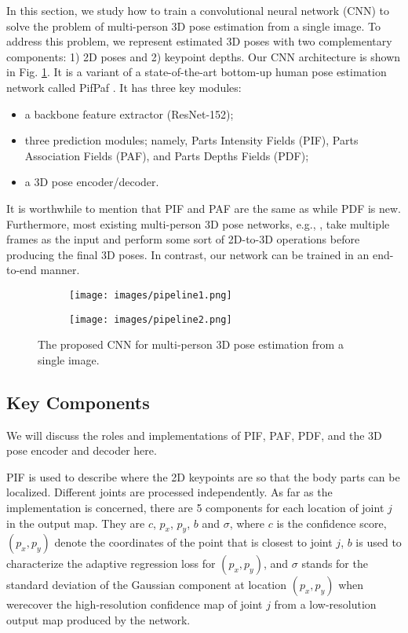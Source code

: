 \documentclass{article}
\begin{document}
In this section, we study how to train a convolutional neural network
(CNN) to solve the problem of multi-person 3D pose estimation from a
single image. To address this problem, we represent estimated 3D poses
with two complementary components: 1) 2D poses and 2) keypoint depths.
Our CNN architecture is shown in Fig. \ref{fig:network}. It is a variant
of a state-of-the-art bottom-up human pose estimation network called
PifPaf \cite{kreiss2019pifpaf}. It has three key modules: 
\begin{itemize}
\item a backbone feature extractor (ResNet-152);
\item three prediction modules; namely, Parts Intensity Fields (PIF), 
Parts Association Fields (PAF), and Parts Depths Fields (PDF);
\item a 3D pose encoder/decoder.
\end{itemize}

It is worthwhile to mention that PIF and PAF are the same as
\cite{kreiss2019pifpaf} while PDF is new. Furthermore, most existing
multi-person 3D pose networks, e.g., \cite{arnab2019exploiting,
huang2019deepfuse}, take multiple frames as the input and perform some
sort of 2D-to-3D operations before producing the final 3D poses. In
contrast, our network can be trained in an end-to-end manner. 

\begin{figure}[h]
\centering
\begin{subfigure}[b]{0.8\textwidth}
\texttt{[image: images/pipeline1.png]}
\end{subfigure}
\begin{subfigure}[b]{0.8\textwidth}
\texttt{[image: images/pipeline2.png]}
\end{subfigure}
\caption{The proposed CNN for multi-person 3D pose estimation 
from a single image.}\label{fig:network}
\end{figure}


\subsection{Key Components}

We will discuss the roles and implementations of PIF, PAF, PDF, and the
3D pose encoder and decoder here. 

PIF is used to describe where the 2D keypoints are so that the body
parts can be localized. Different joints are processed independently.
As far as the implementation is concerned, there are 5 components for
each location of joint $j$ in the output map. They are $c$, $p_x$, $p_y$,
$b$ and $\sigma$, where $c$ is the confidence score, $(p_x, p_y)$ denote
the coordinates of the point that is closest to joint $j$, $b$ is used
to characterize the adaptive regression loss for $(p_x, p_y)$, and
$\sigma$ stands for the standard deviation of the Gaussian component at
location $(p_x, p_y)$ when werecover the high-resolution confidence map
of joint $j$ from a low-resolution output map produced by the network. 
\end{document}
